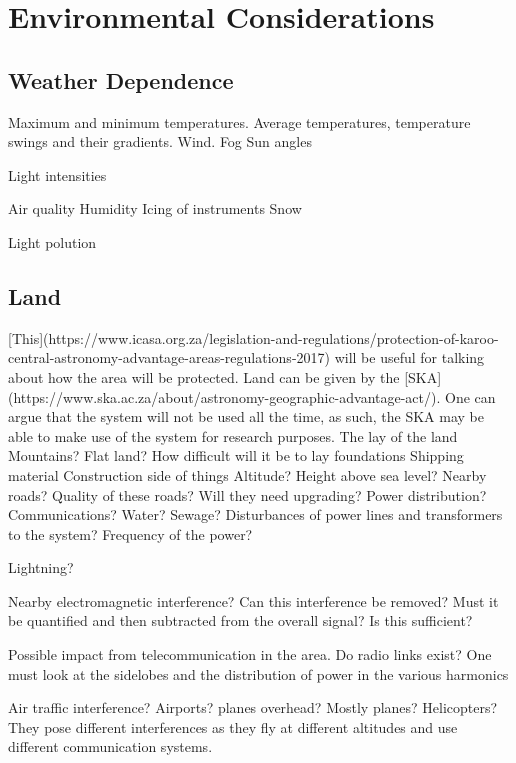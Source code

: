 \documentclass[11pt]{witseiepaper}
\begin{document}
\section{Environmental Considerations} \label{sec:EnvironmentalConsiderations}

\subsection{Weather Dependence} \label{sec:Weatherdependence}

Maximum and minimum temperatures. Average temperatures, temperature swings and their gradients.
Wind.
Fog
Sun angles

Light intensities

Air quality
Humidity
Icing of instruments
Snow


Light polution



\subsection{Land} \label{sec:Land}

[This](https://www.icasa.org.za/legislation-and-regulations/protection-of-karoo-central-astronomy-advantage-areas-regulations-2017) will be useful for talking about how the area will be protected.
Land can be given by the [SKA](https://www.ska.ac.za/about/astronomy-geographic-advantage-act/). One can argue that the system will not be used all the time, as such, the SKA may be able to make use of the system for research purposes.
The lay of the land
Mountains?
Flat land?
How difficult will it be to lay foundations
Shipping material
Construction side of things
Altitude? Height above sea level?
Nearby roads?
Quality of these roads? Will they need upgrading? 
Power distribution? 
Communications?
Water?
Sewage?
Disturbances of power lines and transformers to the system?
Frequency of the power?

Lightning?

Nearby electromagnetic interference?
Can this interference be removed? Must it be quantified and then subtracted from the overall signal? Is this sufficient?

Possible impact from telecommunication in the area. Do radio links exist? 
One must look at the sidelobes and the distribution of power in the various harmonics

Air traffic interference?
Airports? planes overhead?
Mostly planes? Helicopters? They pose different interferences as they fly at different altitudes and use different communication systems.
\end{document}

